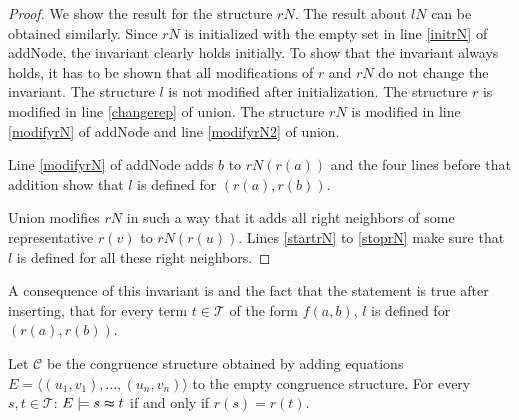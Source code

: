 \begin{proof}

We show the result for the structure $rN$.
The result about $lN$ can be obtained similarly.
Since $rN$ is initialized with the empty set in line \ref{initrN} of addNode, the invariant clearly holds initially.
To show that the invariant always holds, it has to be shown that all modifications of $r$ and $rN$ do not change the invariant.
The structure $l$ is not modified after initialization.
The structure $r$ is modified in line \ref{changerep} of union.
The structure $rN$ is modified in line \ref{modifyrN} of addNode and line \ref{modifyrN2} of union.

Line \ref{modifyrN} of addNode adds $b$ to $rN(r(a))$ and the four lines before that addition show that $l$ is defined for $(r(a),r(b))$.

Union modifies $rN$ in such a way that it adds all right neighbors of some representative $r(v)$ to $rN(r(u))$.
Lines \ref{startrN} to \ref{stoprN} make sure that $l$ is defined for all these right neighbors.

\end{proof}

A consequence of this invariant is and the fact that the statement is true after inserting, that for every term $t \in \mathcal{T}$ of the form $f(a,b)$, $l$ is defined for $(r(a),r(b))$.

\begin{proposition}

Let $\mathcal{C}$ be the congruence structure obtained by adding equations $E = \langle (u_1,v_1), \ldots, (u_n,v_n) \rangle $ to the empty congruence structure.
For every $s,t \in \mathcal{T}$: $E \models s \thickapprox t$ if and only if $r(s) = r(t)$.

\end{proposition}

